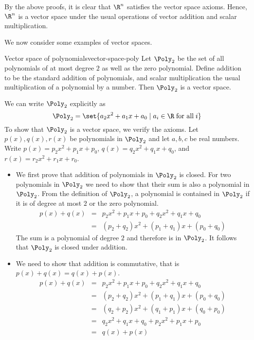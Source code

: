 \begin{solution}
By the above proofs, it is clear that $\R^n$ satisfies the vector space axioms. Hence, $\R^n$ is a vector space under the usual operations of vector addition and scalar multiplication. 
\end{solution}

We now consider some examples of vector spaces. 

\begin{example}{Vector space of polynomials}{vector-space-poly}
Let $\Poly_2$ be the set of all polynomials of at most degree $2$ as well as the zero polynomial. Define addition to be the standard addition of polynomials, and scalar multiplication the usual multiplication of a polynomial by a number. Then $\Poly_2$ is a vector space. 
\end{example}

\begin{solution}
We can write $\Poly_2$ explicitly as 
\[
\Poly_2 = \set{a_2x^2 + a_1x + a_0 \mid a_i \in \R \; \mbox{for all} \; i }
\]
To show that $\Poly_2$ is a vector space, we verify the axioms. Let $p(x), q(x), r(x)$ be polynomials in $\Poly_2$ and let $a,b,c$ be real numbers. Write $p(x)=p_2x^2 + p_1x + p_0$, $q(x)=q_2x^2 + q_1x + q_0$, and $r(x)=r_2x^2 + r_1x + r_0$. 

\begin{itemize}
\item
We first prove that addition of polynomials in $\Poly_2$ is closed. For two polynomials in $\Poly_2$ we need to show that their sum is also a polynomial in $\Poly_2$. From the definition of $\Poly_2$, a polynomial is contained in $\Poly_2$ if it is of degree at most $2$ or the zero polynomial.
\begin{eqnarray*}
p(x) + q(x) &=& p_2x^2 + p_1x + p_0 + q_2x^2+ q_1x + q_0 \\
&=& (p_2+q_2)x^2 + (p_1+q_1)x + (p_0+q_0) 
\end{eqnarray*}
The sum is a polynomial of degree $2$ and therefore is in $\Poly_2$. It follows that $\Poly_2$ is closed under addition. 

\item
We need to show that addition is commutative, that is $p(x)+q(x) = q(x) + p(x)$.   
\begin{eqnarray*}
p(x) + q(x) &=&  p_2x^2 + p_1x + p_0 + q_2x^2 + q_1x + q_0\\
&=& (p_2+q_2)x^2 + (p_1+q_1)x + (p_0+q_0)  \\
&=&  (q_2+p_2)x^2 + (q_1+p_1)x + (q_0+p_0)  \\
&=& q_2x^2 + q_1x + q_0 + p_2x^2  + p_1x + p_0\\
&=& q(x) + p(x)
\end{eqnarray*}


\end{itemize}
\end{solution}
